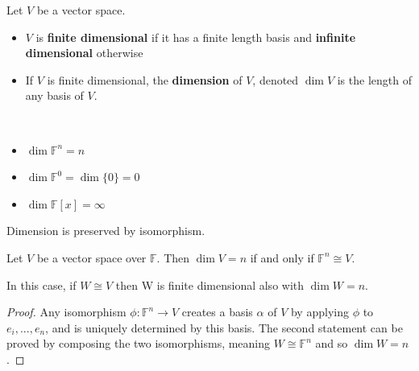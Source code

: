 \begin{definition}
    Let $V$ be a vector space.
    \begin{itemize}
      \item $V$ is {\bf finite dimensional} if it has a finite length basis and {\bf infinite dimensional} otherwise
    \item If $V$ is finite dimensional, the {\bf dimension} of $V$, denoted $\dim V$ is the length of any basis of $V$.
    \end{itemize}
\end{definition}

\begin{example} $ $
    \begin{itemize}
      \item $\dim \mathbb{F}^n = n$        
      \item $\dim \mathbb{F}^0 = \dim \{0\} = 0$
      \item $\dim \mathbb{F}[x] = \infty$
    \end{itemize}
\end{example}

Dimension is preserved by isomorphism.

\begin{prop}
    Let $V$ be a vector space over $\mathbb{F}$. Then $\dim V = n$ if and only if $\mathbb{F}^n \cong V$.

    In this case, if $W \cong V$ then W is finite dimensional also with $\dim W = n$.
\end{prop}
\begin{proof}
  Any isomorphism $\phi : \mathbb{F}^n \rightarrow V$ creates a basis $\alpha$ of $V$ by applying $\phi$ to $e_i,...,e_n$, and is uniquely determined by this basis.
  The second statement can be proved by composing the two isomorphisms, meaning $W \cong \mathbb{F}^n$ and so $\dim W = n$.
\end{proof}
